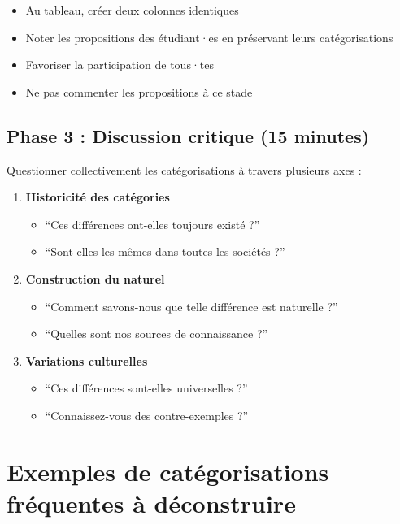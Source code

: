 \documentclass[
  letterpaper,
  DIV=11,
  numbers=noendperiod]{scrreprt}
\providecommand{\tightlist}{%
  \setlength{\itemsep}{0pt}\setlength{\parskip}{0pt}}\usepackage{longtable,booktabs,array}
\begin{document}
\begin{itemize}
\tightlist
\item
  Au tableau, créer deux colonnes identiques
\item
  Noter les propositions des étudiant·es en préservant leurs
  catégorisations
\item
  Favoriser la participation de tous·tes
\item
  Ne pas commenter les propositions à ce stade
\end{itemize}

\subsection{Phase 3 : Discussion critique (15
minutes)}\label{phase-3-discussion-critique-15-minutes}

Questionner collectivement les catégorisations à travers plusieurs axes
:

\begin{enumerate}
\def\labelenumi{\arabic{enumi}.}
\tightlist
\item
  \textbf{Historicité des catégories}

  \begin{itemize}
  \tightlist
  \item
    ``Ces différences ont-elles toujours existé ?''
  \item
    ``Sont-elles les mêmes dans toutes les sociétés ?''
  \end{itemize}
\item
  \textbf{Construction du naturel}

  \begin{itemize}
  \tightlist
  \item
    ``Comment savons-nous que telle différence est naturelle ?''
  \item
    ``Quelles sont nos sources de connaissance ?''
  \end{itemize}
\item
  \textbf{Variations culturelles}

  \begin{itemize}
  \tightlist
  \item
    ``Ces différences sont-elles universelles ?''
  \item
    ``Connaissez-vous des contre-exemples ?''
  \end{itemize}
\end{enumerate}

\section{Exemples de catégorisations fréquentes à
déconstruire}\label{exemples-de-catuxe9gorisations-fruxe9quentes-uxe0-duxe9construire}
\end{document}
